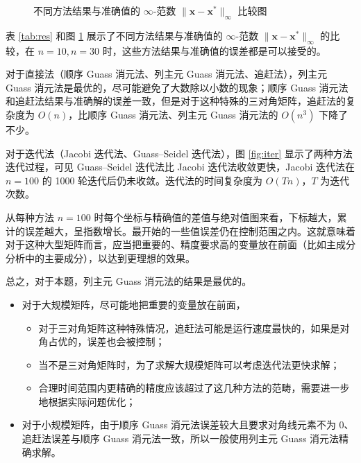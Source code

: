 \documentclass{sjtuarticle}
\begin{document}
\begin{figure}[h]
\centering
{}
\caption{不同方法结果与准确值的 $\infty$-范数 $\lVert \bm{x}-\bm{x}^* \rVert_\infty$ 比较图}
\label{fig:res}
\end{figure}

表 \ref{tab:res} 和图 \ref{fig:res} 展示了不同方法结果与准确值的 $\infty$-范数 $\lVert \bm{x}-\bm{x}^* \rVert_\infty$ 的比较，在 $n=10,n=30$ 时，这些方法结果与准确值的误差都是可以接受的。

对于直接法（顺序 Guass 消元法、列主元 Guass 消元法、追赶法），列主元 Guass 消元法是最优的，尽可能避免了大数除以小数的现象；顺序 Guass 消元法和追赶法结果与准确解的误差一致，但是对于这种特殊的三对角矩阵，追赶法的复杂度为 $O(n)$，比顺序 Guass 消元法、列主元 Guass 消元法的 $O(n^3)$ 下降了不少。

对于迭代法（Jacobi 迭代法、Guass--Seidel 迭代法），图 \ref{fig:iter} 显示了两种方法迭代过程，可见 Guass--Seidel 迭代法比 Jacobi 迭代法收敛更快，Jacobi 迭代法在 $n=100$ 的 1000 轮迭代后仍未收敛。迭代法的时间复杂度为 $O(Tn)$，$T$ 为迭代次数。

从每种方法 $n=100$ 时每个坐标与精确值的差值与绝对值图来看，下标越大，累计的误差越大，呈指数增长。最开始的一些值误差仍在控制范围之内。这就意味着对于这种大型矩阵而言，应当把重要的、精度要求高的变量放在前面（比如主成分分析中的主要成分），以达到更理想的效果。

总之，对于本题，列主元 Guass 消元法的结果是最优的。
\begin{itemize}
    \item 对于大规模矩阵，尽可能地把重要的变量放在前面，
    \begin{itemize}
        \item 对于三对角矩阵这种特殊情况，追赶法可能是运行速度最快的，如果是对角占优的，误差也会被控制；
        \item 当不是三对角矩阵时，为了求解大规模矩阵可以考虑迭代法更快求解；
        \item 合理时间范围内更精确的精度应该超过了这几种方法的范畴，需要进一步地根据实际问题优化；
    \end{itemize}
    \item 对于小规模矩阵，由于顺序 Guass 消元法误差较大且要求对角线元素不为 0、追赶法误差与顺序 Guass 消元法一致，所以一般使用列主元 Guass 消元法精确求解。
\end{itemize}
\end{document}
